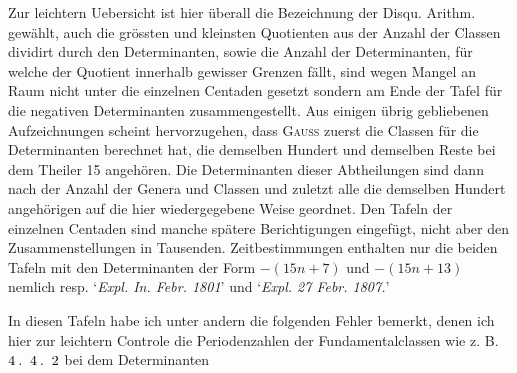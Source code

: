 Zur leichtern Uebersicht ist hier überall die Bezeichnung der Disqu. Arithm. gewählt, auch die grössten und kleinsten Quotienten aus der Anzahl der Classen dividirt durch den Determinanten, sowie die Anzahl der Determinanten, für welche der Quotient innerhalb gewisser Grenzen fällt, sind wegen Mangel an Raum nicht unter die einzelnen Centaden gesetzt sondern am Ende der Tafel für die negativen Determinanten zusammengestellt. Aus einigen übrig gebliebenen Aufzeichnungen scheint hervorzugehen, dass \textsc{Gauss} zuerst die Classen für die Determinanten berechnet hat, die demselben Hundert und demselben Reste bei dem Theiler 15 angehören. Die Determinanten dieser Abtheilungen sind dann nach der Anzahl der Genera und Classen und zuletzt alle die demselben Hundert angehörigen auf die hier wiedergegebene Weise geordnet.
Den Tafeln der einzelnen Centaden sind manche spätere Berichtigungen eingefügt, nicht aber den Zusammenstellungen in Tausenden. Zeitbestimmungen enthalten nur die beiden Tafeln mit den Determinanten der Form $-(15n+7)$ und $-(15n+13)$ nemlich resp. ‘\textit{Expl. In. Febr. 1801}’ und ‘\textit{Expl. 27 Febr. 1807.}’
\par In diesen Tafeln habe ich unter andern die folgenden Fehler bemerkt, denen ich hier zur leichtern Controle die Periodenzahlen der Fundamentalclassen wie z. B. $4\pdot\ 4\pdot\ 2$ bei dem Determinanten
